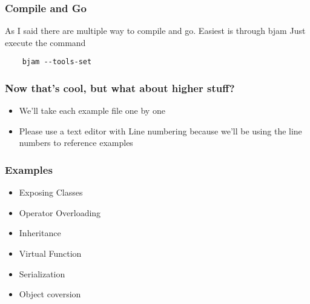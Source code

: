 \documentclass{beamer}
\begin{document}
\begin{frame}[fragile]
\frametitle{Compile and Go}
\label{sec-2_7}

   As I said there are multiple way to compile and go. Easiest is through bjam
   Just execute the command
\begin{verbatim}
    bjam --tools-set
\end{verbatim}

   
\end{frame}
\begin{frame}
\frametitle{Now that's cool, but what about higher stuff?}
\label{sec-2_8}


\begin{itemize}
\item We'll take each example file one by one
\item Please use a text editor with Line numbering because we'll be using the line numbers to reference examples
\end{itemize}
\end{frame}
\begin{frame}
\frametitle{Examples}
\label{sec-2_9}


\begin{itemize}
\item Exposing Classes
\item Operator Overloading
\item Inheritance
\item Virtual Function
\item Serialization
\item Object coversion
\end{itemize}
\end{frame}
\end{document}
